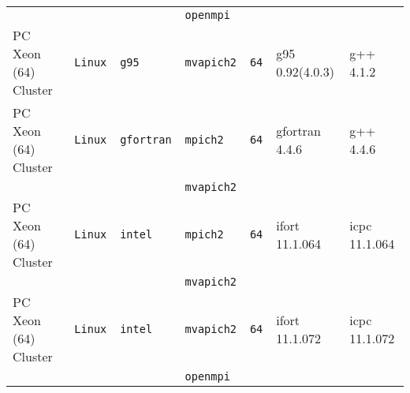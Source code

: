 \begin{tabular}{lllllll}
                      &           &                 &\tt openmpi    &                    &                                    &                                 \\
PC Xeon (64) Cluster  &\tt Linux  &\tt g95          &\tt mvapich2   &\tt 64              & g95 \footnotesize 0.92(4.0.3)      & g++ \footnotesize 4.1.2         \\ %
PC Xeon (64) Cluster  &\tt Linux  &\tt gfortran     &\tt mpich2     &\tt 64              & gfortran \footnotesize 4.4.6       & g++ \footnotesize 4.4.6         \\ %
                      &           &                 &\tt mvapich2   &                    &                                    &                                 \\
PC Xeon (64) Cluster  &\tt Linux  &\tt intel        &\tt mpich2     &\tt 64              & ifort \footnotesize 11.1.064       & icpc \footnotesize 11.1.064     \\ %
                      &           &                 &\tt mvapich2   &                    &                                    &                                 \\
PC Xeon (64) Cluster  &\tt Linux  &\tt intel        &\tt mvapich2   &\tt 64              & ifort \footnotesize 11.1.072       & icpc \footnotesize 11.1.072     \\ %
                      &           &                 &\tt openmpi    &                    &                                    &                                 \\

\end{tabular}
